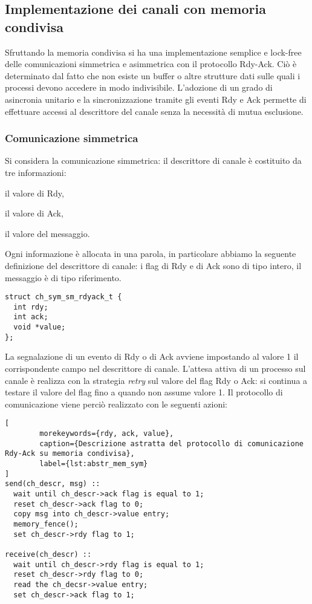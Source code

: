\FloatBarrier
\subsection{Implementazione dei canali con memoria condivisa}
\label{sct:specifica_sm}
Sfruttando la memoria condivisa si ha una implementazione semplice e lock-free delle comunicazioni simmetrica e asimmetrica con il protocollo Rdy-Ack. Ci\`o \`e determinato dal fatto che non esiste un buffer o altre strutture dati sulle quali i processi devono accedere in modo indivisibile. L'adozione di un grado di asincronia unitario e la sincronizzazione tramite gli eventi Rdy e Ack permette di effettuare accessi al descrittore del canale senza la necessit\`a di mutua esclusione.

\subsubsection{Comunicazione simmetrica}
\label{sct:sym_sm_rdyack}
Si considera la comunicazione simmetrica: il descrittore di canale \`e costituito da tre informazioni:
\begin{inparaenum} 
\item il valore di Rdy, \item il valore di Ack, \item il valore del messaggio.
\end{inparaenum}
Ogni informazione \`e allocata in una parola, in particolare abbiamo la seguente definizione del descrittore di canale:  i flag di Rdy e di Ack sono di tipo intero, il messaggio \`e di tipo riferimento.
\begin{lstlisting}
struct ch_sym_sm_rdyack_t { 
  int rdy; 
  int ack; 
  void *value;
};
\end{lstlisting}
La segnalazione di un evento di Rdy o di Ack avviene impostando al valore 1 il corrispondente campo nel descrittore di canale. L'attesa attiva di un processo sul canale \`e realizza con la strategia \emph{retry} sul valore del flag Rdy o Ack: si continua a testare il valore del flag fino a quando non assume valore 1.
Il protocollo di comunicazione viene perci\`o realizzato con le seguenti azioni:
\begin{lstlisting}[
        morekeywords={rdy, ack, value},
        caption={Descrizione astratta del protocollo di comunicazione Rdy-Ack su memoria condivisa},
        label={lst:abstr_mem_sym}
]       
send(ch_descr, msg) ::
  wait until ch_descr->ack flag is equal to 1;
  reset ch_descr->ack flag to 0;
  copy msg into ch_descr->value entry;
  memory_fence();
  set ch_descr->rdy flag to 1;

receive(ch_descr) ::
  wait until ch_descr->rdy flag is equal to 1;
  reset ch_descr->rdy flag to 0;
  read the ch_decsr->value entry;
  set ch_descr->ack flag to 1;
\end{lstlisting}

